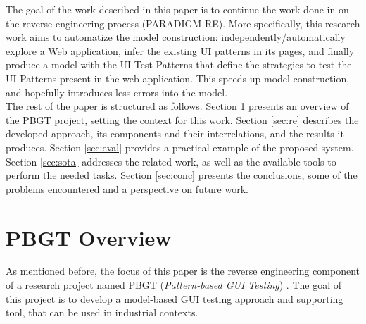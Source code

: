 \documentclass[conference]{IEEEtran}
\begin{document}
The goal of the work described in this paper is to continue the work done in \cite{nabuco2013inferring} on the reverse engineering process (PARADIGM-RE). More specifically, this research work aims to automatize the model construction: independently/automatically explore a Web application, infer the existing UI patterns in its pages, and finally produce a model with the UI Test Patterns that define the strategies to test the UI Patterns present in the web application. This speeds up model construction, and hopefully introduces less errors into the model.\\

The rest of the paper is structured as follows. Section \ref{sec:pbgt} presents an overview of the PBGT project, setting the context for this work.  Section \ref{sec:re} describes the developed approach, its components and  their interrelations, and the results it produces. Section \ref{sec:eval} provides a practical example of the proposed system. Section \ref{sec:sota} addresses the related work, as well as the available tools to perform the needed tasks. Section \ref{sec:conc} presents the conclusions, some of the problems encountered and a perspective on future work. \\

\section{PBGT Overview}\label{sec:pbgt}

As mentioned before, the focus of this paper is the reverse engineering component of a research project named PBGT (\textit{Pattern-based GUI Testing}) \cite{moreira2013pattern}. The goal of this project is to develop a model-based GUI testing approach and supporting tool, that can be used in industrial contexts.\\
\end{document}
